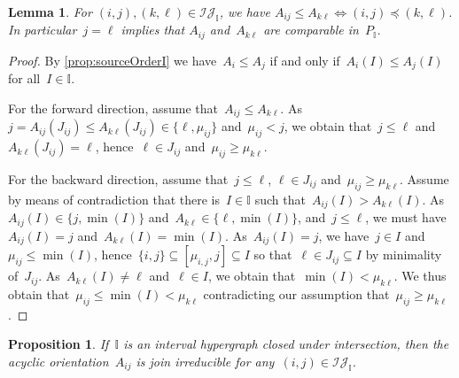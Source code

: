 \documentclass{amsart}
\newtheorem{proposition}[theorem]{Proposition}
\newtheorem{lemma}[theorem]{Lemma}
\theoremstyle{definition}
\newcommand{\cal}[1]{\mathcal{#1}} %
\newcommand{\II}{\mathbb I} %
\newcommand{\cIJ}{\cal{IJ}} %
\begin{document}
\begin{lemma}
\label{lem:irrorder2}
For $(i,j), (k,\ell) \in \cIJ_\II$, we have $A_{ij} \le A_{k\ell} \iff (i,j) \preccurlyeq (k,\ell)$.
In particular~$j = \ell$ implies that $A_{ij}$ and~$A_{k\ell}$ are comparable in~$P_\II$.
\end{lemma}

\begin{proof}
By \cref{prop:sourceOrderI} we have~$A_i \le A_j$ if and only if~$A_i(I) \le A_j(I)$ for all~$I \in \II$.

For the forward direction, assume that~$A_{ij} \le A_{k\ell}$.
As~$j = A_{ij}(J_{ij}) \le A_{k\ell}(J_{ij}) \in \{\ell, \mu_{ij}\}$ and~$\mu_{ij} < j$, we obtain that~$j \le \ell$ and~$A_{k\ell}(J_{ij}) = \ell$, hence~$\ell \in J_{ij}$ and~$\mu_{ij} \ge \mu_{k\ell}$.

For the backward direction, assume that~$j \le \ell$, $\ell \in J_{ij}$ and~$\mu_{ij} \ge \mu_{k\ell}$.
Assume by means of contradiction that there is~$I \in \II$ such that~$A_{ij}(I) > A_{k\ell}(I)$.
As $A_{ij}(I) \in \{j, \min(I)\}$ and~$A_{k\ell} \in \{\ell, \min(I)\}$, and~$j \le \ell$, we must have~$A_{ij}(I) = j$ and~$A_{k\ell}(I) = \min(I)$.
As~$A_{ij}(I) = j$, we have~$j \in I$ and~$\mu_{ij} \le \min(I)$, hence~$\{i,j\} \subseteq [\mu_{i,j},j] \subseteq I$ so that~$\ell \in J_{ij} \subseteq I$ by minimality of~$J_{ij}$.
As~$A_{k\ell}(I) \ne \ell$ and~$\ell \in I$, we obtain that~$\min(I) < \mu_{k\ell}$.
We thus obtain that~$\mu_{ij} \le \min(I) < \mu_{k\ell}$ contradicting our assumption that~$\mu_{ij} \ge \mu_{k\ell}$.
\end{proof}

\begin{proposition}
\label{prop:AijJoinIrreducible}
If~$\II$ is an interval hypergraph closed under intersection, then the acyclic orientation~$A_{ij}$ is join irreducible for any~$(i,j) \in \cIJ_\II$.
\end{proposition}
\end{document}
